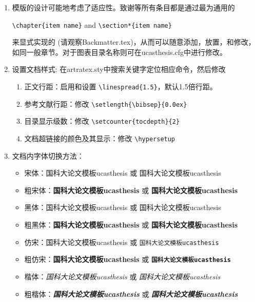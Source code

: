 \begin{enumerate}
    \item 模版的设计可能地考虑了适应性。致谢等所有条目都是通过最为通用的

        \verb+\chapter{item name}+  and \verb+\section*{item name}+

        来显式实现的 (请观察Backmatter.tex)，从而可以随意添加，放置，和修改，如同一般章节。对于图表目录名称则可在ucasthesis.cfg中进行修改。

    \item 设置文档样式: 在artratex.sty中搜索关键字定位相应命令，然后修改
        \begin{enumerate}
            \item 正文行距：启用和设置 \verb|\linespread{1.5}|，默认1.5倍行距。
            \item 参考文献行距：修改 \verb|\setlength{\bibsep}{0.0ex}|
            \item 目录显示级数：修改 \verb|\setcounter{tocdepth}{2}|
            \item 文档超链接的颜色及其显示：修改 \verb|\hypersetup|
        \end{enumerate}

    \item 文档内字体切换方法：
        \begin{itemize}
            \item 宋体：国科大论文模板ucasthesis 或 \textrm{国科大论文模板ucasthesis}
            \item 粗宋体：{\bfseries 国科大论文模板ucasthesis} 或 \textbf{国科大论文模板ucasthesis}
            \item 黑体：{\sffamily 国科大论文模板ucasthesis} 或 \textsf{国科大论文模板ucasthesis}
            \item 粗黑体：{\bfseries\sffamily 国科大论文模板ucasthesis} 或 \textsf{\bfseries 国科大论文模板ucasthesis}
            \item 仿宋：{\ttfamily 国科大论文模板ucasthesis} 或 \texttt{国科大论文模板ucasthesis}
            \item 粗仿宋：{\bfseries\ttfamily 国科大论文模板ucasthesis} 或 \texttt{\bfseries 国科大论文模板ucasthesis}
            \item 楷体：{\itshape 国科大论文模板ucasthesis} 或 \textit{国科大论文模板ucasthesis}
            \item 粗楷体：{\bfseries\itshape 国科大论文模板ucasthesis} 或 \textit{\bfseries 国科大论文模板ucasthesis}
        \end{itemize}


\end{enumerate}
